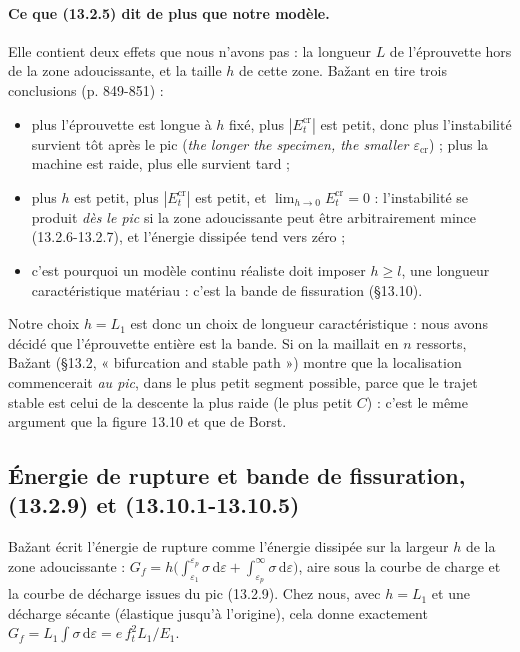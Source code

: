 \documentclass[11pt,a4paper]{article}
\newcommand{\dd}{\mathrm{d}}
\begin{document}
\paragraph{Ce que (13.2.5) dit de plus que notre modèle.} Elle contient deux effets que
nous n'avons pas : la longueur $L$ de l'éprouvette hors de la zone adoucissante, et la taille
$h$ de cette zone. Bažant en tire trois conclusions (p. 849-851) :
\begin{itemize}[nosep]
  \item plus l'éprouvette est longue à $h$ fixé, plus $|E_t^{\text{cr}}|$ est petit, donc plus
        l'instabilité survient tôt après le pic (\emph{the longer the specimen, the smaller
        $\varepsilon_{\text{cr}}$}) ; plus la machine est raide, plus elle survient tard ;
  \item plus $h$ est petit, plus $|E_t^{\text{cr}}|$ est petit, et $\lim_{h\to0}E_t^{\text{cr}} = 0$ :
        l'instabilité se produit \emph{dès le pic} si la zone adoucissante peut être
        arbitrairement mince (13.2.6-13.2.7), et l'énergie dissipée tend vers zéro ;
  \item c'est pourquoi un modèle continu réaliste doit imposer $h \ge l$, une longueur
        caractéristique matériau : c'est la bande de fissuration (§13.10).
\end{itemize}
Notre choix $h = L_1$ est donc un choix de longueur caractéristique : nous avons décidé que
l'éprouvette entière est la bande. Si on la maillait en $n$ ressorts, Bažant (§13.2,
« bifurcation and stable path ») montre que la localisation commencerait \emph{au pic}, dans
le plus petit segment possible, parce que le trajet stable est celui de la descente la plus
raide (le plus petit $C$) : c'est le même argument que la figure 13.10 et que de Borst.

\subsection{Énergie de rupture et bande de fissuration, (13.2.9) et (13.10.1-13.10.5)}
Bažant écrit l'énergie de rupture comme l'énergie dissipée sur la largeur $h$ de la zone
adoucissante : $G_f = h\bigl(\int_{\varepsilon_1}^{\varepsilon_p}\sigma\,\dd\varepsilon + \int_{\varepsilon_p}^\infty\sigma\,\dd\varepsilon\bigr)$,
aire sous la courbe de charge et la courbe de décharge issues du pic (13.2.9). Chez nous, avec
$h = L_1$ et une décharge sécante (élastique jusqu'à l'origine), cela donne exactement
$G_f = L_1\int\sigma\,\dd\varepsilon = e\,f_t^2L_1/E_1$.
\end{document}
